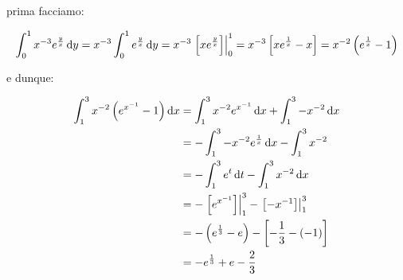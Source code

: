 prima facciamo:

\[
    \int_{0}^{1} x ^{-3} e ^{ \frac{y}{x}} \mathop{}\!\mathrm{d}{y} =
    x ^{-3} \int_{0}^{1} e ^{ \frac{y}{x}} \mathop{}\!\mathrm{d}{y} =
    x ^{-3} \left.\left[ x e ^{ \frac{y}{x}} \right]\right\rvert_{0}^{1} =
    x ^{-3} \left[ x e ^{ \frac{1}{x}}-x \right] =
    x ^{-2} \left(e ^{ \frac{1}{x}} -1\right)
\]

e dunque:

\begin{align*}
    \int_{1}^{3} x ^{-2} \left(e^{x^{-1}}-1\right) \mathop{}\!\mathrm{d}{x} & = \int_{1}^{3} x ^{-2} e^{x^{-1}} \mathop{}\!\mathrm{d}{x} + \int_{1}^{3} -x^{-2} \mathop{}\!\mathrm{d}{x}    \\
                                                            & = - \int_{1}^{3} -x ^{-2} e ^{ \frac{1}{x}} \mathop{}\!\mathrm{d}{x} - \int_{1}^{3} x^{-2}    \\
                                                            & = - \int_{1}^{3} e^t \mathop{}\!\mathrm{d}{t} - \int_{1}^{3} x^{-2} \mathop{}\!\mathrm{d}{x}                  \\
                                                            & = -\left.\left[ e^{x^{-1}}\right]\right\rvert_{1}^{3} -\left.\left[ -x^{-1} \right]\right\rvert_{1}^{3} \\
                                                            & = -\left( e ^{ \frac{1}{3}} - e \right) -\left[ -\frac{1}{3} - (-1) \right]   \\
                                                            & = -e ^{\frac{1}{3}} + e -\frac{2}{3}
\end{align*}
